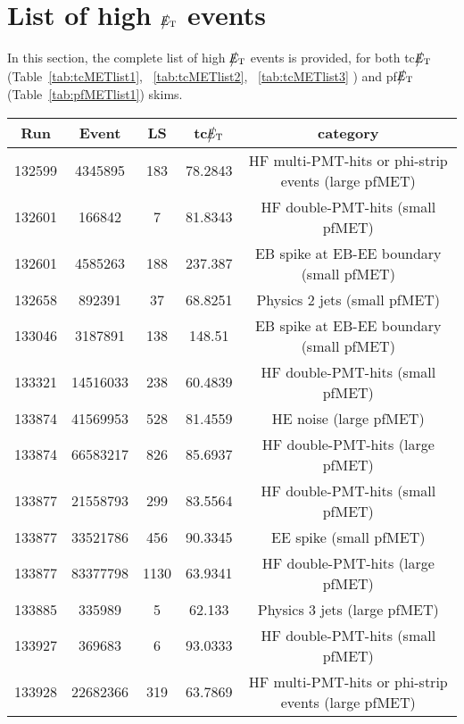 \section{List of high $\big\slash\hspace{-1.6ex}{E_\text{T}}$ events}

In this section, the complete list of high $\big\slash\hspace{-1.6ex}{E_\text{T}}$ events is provided, for both tc$\big\slash\hspace{-1.6ex}{E_\text{T}}$ 
(Table~\ref{tab:tcMETlist1}, ~\ref{tab:tcMETlist2}, ~\ref{tab:tcMETlist3} ) and pf$\big\slash\hspace{-1.6ex}{E_\text{T}}$ 
(Table~\ref{tab:pfMETlist1}) skims.


\begin{table}[htbp]
  \begin{center}
    \begin{tabular}{|c|c|c|c|c|}
      \hline
      Run & Event & LS & tc$\big\slash\hspace{-1.6ex}{E_\text{T}}$ & category \\     
      \hline
      132599 & 4345895     & 183  &    78.2843  & HF multi-PMT-hits or phi-strip events (large pfMET) \\
      132601 & 166842      & 7    &    81.8343  & HF double-PMT-hits  (small pfMET) \\
      132601 & 4585263     & 188  &    237.387  & EB spike at EB-EE boundary (small pfMET) \\
      132658 & 892391      & 37   &    68.8251  & Physics 2 jets (small pfMET) \\
      133046 & 3187891     & 138  &    148.51   & EB spike at EB-EE boundary (small pfMET) \\
      133321 & 14516033    & 238  &    60.4839  & HF double-PMT-hits  (small pfMET) \\
      133874 & 41569953    & 528  &    81.4559  & HE noise (large pfMET) \\
      133874 & 66583217    & 826  &    85.6937  & HF double-PMT-hits  (large pfMET) \\
      133877 & 21558793    & 299  &    83.5564  & HF double-PMT-hits  (small pfMET) \\
      133877 & 33521786    & 456  &    90.3345  & EE spike (small pfMET) \\
      133877 & 83377798    & 1130 &    63.9341  & HF double-PMT-hits  (large pfMET) \\
      133885 & 335989      & 5    &    62.133   & Physics 3 jets (large pfMET) \\
      133927 & 369683      & 6    &    93.0333  & HF double-PMT-hits  (small pfMET) \\
      133928 & 22682366    & 319  &    63.7869  & HF multi-PMT-hits or phi-strip events (large pfMET) \\

\end{tabular}
\end{center}
\end{table}
